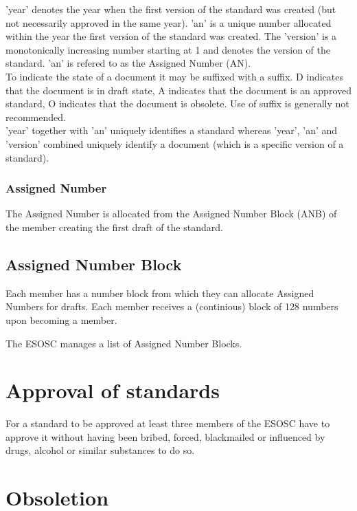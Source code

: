 \documentclass[paper=a4, fontsize=11pt]{scrartcl}
\numberwithin{equation}{section}
\numberwithin{figure}{section}
\numberwithin{table}{section}
\begin{document}
	
'year' denotes the year when the first version of the standard was created
(but not necessarily approved in the same year). 'an' is a unique number 
allocated within the year the first version of the standard was created. The
'version' is a monotonically increasing number starting at 1 and denotes
the version of the standard. 'an' is refered to as the Assigned Number (AN). \\


To indicate the state of a document it may be suffixed with a suffix. 
D indicates that the document is in draft state, A indicates that the document
is an approved standard, O indicates that the document is obsolete. Use of
suffix is generally not recommended. \\


'year' together with 'an' uniquely identifies a standard whereas 'year', 'an' 
and 'version' combined uniquely identify a document (which is a specific version
of a standard).

\subsubsection{Assigned Number}

The Assigned Number is allocated from the Assigned Number Block (ANB) of the member
creating the first draft of the standard. 

\subsection{Assigned Number Block}

Each member has a number block from which they can allocate Assigned Numbers
for drafts. Each member receives a (continious) block of 128 numbers upon 
becoming a member. 

The ESOSC manages a list of Assigned Number Blocks. 


\section{Approval of standards }

For a standard to be approved at least three members of the ESOSC have to
approve it without having been bribed, forced, blackmailed or influenced by
drugs, alcohol or similar substances to do so. 


\section{Obsoletion}
\end{document}
